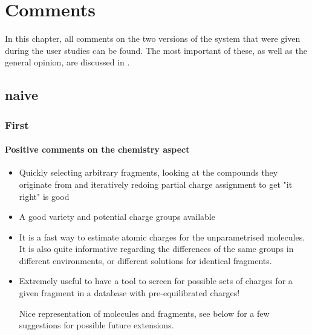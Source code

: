 \chapter{Comments}

In this chapter, all comments on the two versions of the system that were given during the user studies can be found. The most important of these, as well as the general opinion, are discussed in .

\section{\oframp{} naive}
\subsection{First}
\subsubsection{Positive comments on the chemistry aspect}
\begin{itemize}
\item Quickly selecting arbitrary fragments, looking at the compounds they originate from and iteratively redoing partial charge assignment to get "it right" is good

\item A good variety and potential charge groups available

\item It is a fast way to estimate atomic charges for the unparametrised molecules. It is also quite informative regarding the differences of the same groups in different environments, or different solutions for identical fragments.

\item Extremely useful to have a tool to screen for possible sets of charges for a given fragment in a database with pre-equilibrated charges!


Nice representation of molecules and fragments, see below for a few suggestions for possible future extensions.

\end{itemize}



